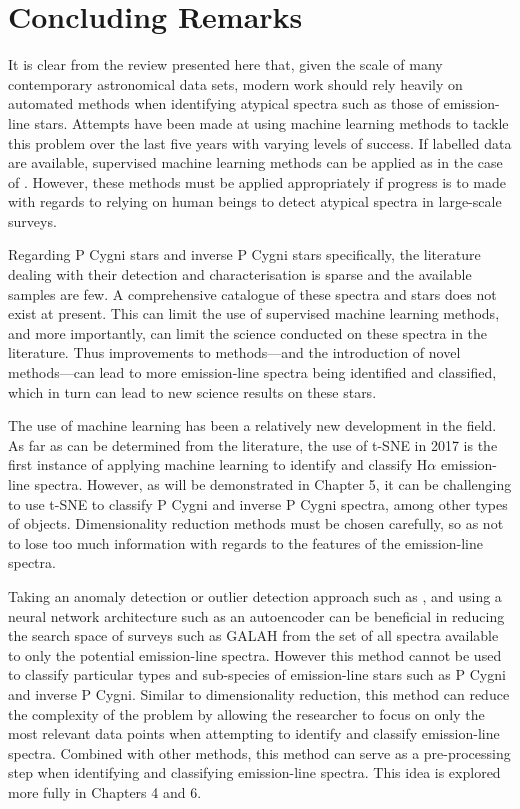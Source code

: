 \section{Concluding Remarks}

It is clear from the review presented here that, given the scale of many contemporary astronomical data sets, modern work should rely heavily on automated methods when identifying atypical spectra such as those of emission-line stars. Attempts have been made at using machine learning methods to tackle this problem over the last five years with varying levels of success. If labelled data are available, supervised machine learning methods can be applied as in the case of \citet{zhang2021catalog}. However, these methods must be applied appropriately if progress is to made with regards to relying on human beings to detect atypical spectra in large-scale surveys.

Regarding P Cygni stars and inverse P Cygni stars specifically, the literature dealing with their detection and characterisation is sparse and the available samples are few. A comprehensive catalogue of these spectra and stars does not exist at present. This can limit the use of supervised machine learning methods, and more importantly, can limit the science conducted on these spectra in the literature. Thus improvements to methods—and the introduction of novel methods—can lead to more emission-line spectra being identified and classified, which in turn can lead to new science results on these stars. 

The use of machine learning has been a relatively new development in the field. As far as can be determined from the literature, the use of t-SNE in 2017 is the first instance of applying machine learning to identify and classify H$\alpha$ emission-line spectra. However, as will be demonstrated in Chapter 5, it can be challenging to use t-SNE to classify P Cygni and inverse P Cygni spectra, among other types of objects. Dimensionality reduction methods must be chosen carefully, so as not to lose too much information with regards to the features of the emission-line spectra.

Taking an anomaly detection or outlier detection approach such as \citet{vcotar2021galah}, and using a neural network architecture such as an autoencoder can be beneficial in reducing the search space of surveys such as GALAH from the set of all spectra available to only the potential emission-line spectra. However this method cannot be used to classify particular types and sub-species of emission-line stars such as P Cygni and inverse P Cygni. Similar to dimensionality reduction, this method can reduce the complexity of the problem by allowing the researcher to focus on only the most relevant data points when attempting to identify and classify emission-line spectra. Combined with other methods, this method can serve as a pre-processing step when identifying and classifying emission-line spectra. This idea is explored more fully in Chapters 4 and 6. 

